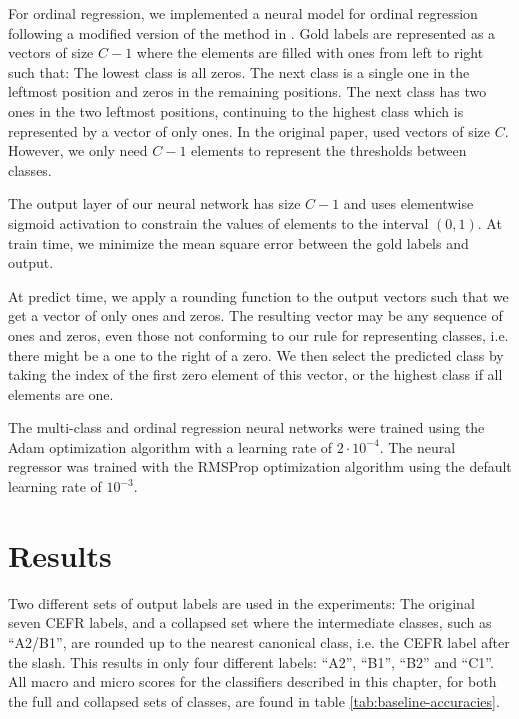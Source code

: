 For ordinal regression, we implemented a neural model for ordinal regression
following a modified version of the method in \textcite{cheng2008neural}.
Gold labels are represented as a vectors of size $C-1$ where the elements are
filled with ones from left to right such that: The lowest class is all zeros.
The next class is a single one in the leftmost position and zeros in the
remaining positions. The next class has two ones in the two leftmost
positions, continuing to the highest class which is represented by a vector
of only ones. In the original paper, \citeauthor{cheng2008neural} used
vectors of size $C$. However, we only need $C-1$ elements to represent the
thresholds between classes.

The output layer of our neural network has size $C-1$ and uses elementwise
sigmoid activation to constrain the values of elements to the interval
$(0,1)$. At train time, we minimize the mean square error between the gold
labels and output.

At predict time, we apply a rounding function to the output vectors such that
we get a vector of only ones and zeros. The resulting vector may be any
sequence of ones and zeros, even those not conforming to our rule for
representing classes, i.e. there might be a one to the right of a zero. We
then select the predicted class by taking the index of the first zero element
of this vector, or the highest class if all elements are one.

The multi-class and ordinal regression neural networks were trained using the
Adam optimization algorithm \autocite{kingma2014adam} with a learning rate of
$2\cdot 10^{-4}$. The neural regressor was trained with the RMSProp
optimization algorithm using the default learning rate of $10^{-3}$.


\section{Results}

Two different sets of output labels are used in the experiments: The original
seven CEFR labels, and a collapsed set where the intermediate classes, such
as ``A2/B1'', are rounded up to the nearest canonical class, i.e. the CEFR
label after the slash. This results in only four different labels: ``A2'',
``B1'', ``B2'' and ``C1''. All macro and micro \FI scores for the classifiers
described in this chapter, for both the full and collapsed sets of classes,
are found in table \ref{tab:baseline-accuracies}.

